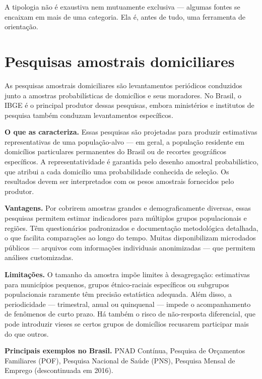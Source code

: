 A tipologia não é exaustiva nem mutuamente exclusiva — algumas fontes se encaixam em mais de uma categoria. Ela é, antes de tudo, uma ferramenta de orientação.

\section{Pesquisas amostrais domiciliares}

As pesquisas amostrais domiciliares são levantamentos periódicos conduzidos junto a amostras probabilísticas de domicílios e seus moradores. No Brasil, o IBGE é o principal produtor dessas pesquisas, embora ministérios e institutos de pesquisa também conduzam levantamentos específicos.

\textbf{O que as caracteriza.} Essas pesquisas são projetadas para produzir estimativas representativas de uma população-alvo — em geral, a população residente em domicílios particulares permanentes do Brasil ou de recortes geográficos específicos. A representatividade é garantida pelo desenho amostral probabilístico, que atribui a cada domicílio uma probabilidade conhecida de seleção. Os resultados devem ser interpretados com os pesos amostrais fornecidos pelo produtor.

\textbf{Vantagens.} Por cobrirem amostras grandes e demograficamente diversas, essas pesquisas permitem estimar indicadores para múltiplos grupos populacionais e regiões. Têm questionários padronizados e documentação metodológica detalhada, o que facilita comparações ao longo do tempo. Muitas disponibilizam microdados públicos — arquivos com informações individuais anonimizadas — que permitem análises customizadas.

\textbf{Limitações.} O tamanho da amostra impõe limites à desagregação: estimativas para municípios pequenos, grupos étnico-raciais específicos ou subgrupos populacionais raramente têm precisão estatística adequada. Além disso, a periodicidade — trimestral, anual ou quinquenal — impede o acompanhamento de fenômenos de curto prazo. Há também o risco de não-resposta diferencial, que pode introduzir vieses se certos grupos de domicílios recusarem participar mais do que outros.

\textbf{Principais exemplos no Brasil.} PNAD Contínua, Pesquisa de Orçamentos Familiares (POF), Pesquisa Nacional de Saúde (PNS), Pesquisa Mensal de Emprego (descontinuada em 2016).

